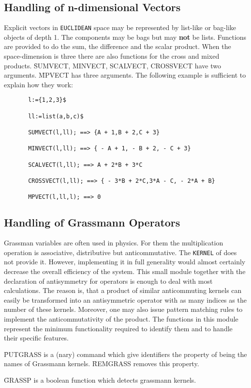 \subsection{Handling of n-dimensional Vectors}
Explicit vectors in {\tt EUCLIDEAN} space may be represented by
list-like or bag-like objects of depth 1.
The components may be bags but may {\bf not} be lists.
Functions are provided to do the sum, the difference and the
scalar product. When the space-dimension is three there are also functions
for the cross and mixed products.
\f{SUMVECT, MINVECT, SCALVECT, CROSSVECT} have two arguments.
\f{MPVECT} has three arguments. The following example
is sufficient to explain how they work:
\begin{verbatim}
       l:={1,2,3}$

       ll:=list(a,b,c)$

       SUMVECT(l,ll); ==> {A + 1,B + 2,C + 3}

       MINVECT(l,ll); ==> { - A + 1, - B + 2, - C + 3}

       SCALVECT(l,ll); ==> A + 2*B + 3*C

       CROSSVECT(l,ll); ==> { - 3*B + 2*C,3*A - C, - 2*A + B}

       MPVECT(l,ll,l); ==> 0
\end{verbatim}
\subsection{Handling of Grassmann Operators}
Grassman variables are often used in physics. For them the multiplication
operation is associative, distributive but anticommutative. The
{\tt KERNEL} of \REDUCE does not provide it. However, implementing
it in full generality would almost
certainly decrease the overall efficiency of the system. This small
module together with the declaration of antisymmetry for operators is
enough to deal with most calculations. The reason is, that a
product of similar anticommuting kernels can easily  be transformed
into an antisymmetric operator with as many indices as the number of
these kernels. Moreover, one may also issue pattern matching rules
to implement the anticommutativity of the product.
The functions in this module represent the minimum functionality
required to identify them and to handle their specific features.

\f{PUTGRASS} is a (nary) command which give identifiers the property
of being the names of Grassmann kernels. \f{REMGRASS} removes this property.

\f{GRASSP} is a boolean function which detects grassmann kernels.

